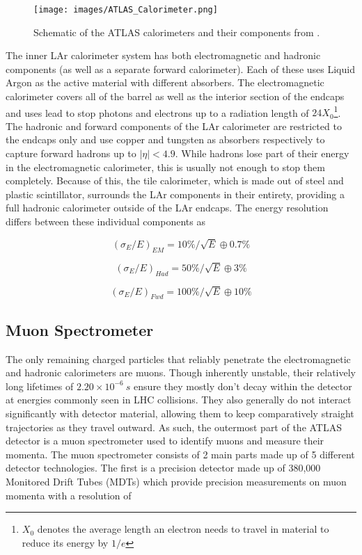 \begin{figure}
\centering
    \texttt{[image: images/ATLAS\_Calorimeter.png]}
    \caption{Schematic of the ATLAS calorimeters and their components from \cite{atlas-run3-setup}.}
    \label{fig:ATLAS_Calorimeter}
\end{figure}

The inner LAr calorimeter system has both electromagnetic and hadronic components (as well as a separate forward 
calorimeter). Each of these uses Liquid Argon as the active material with different absorbers. The electromagnetic 
calorimeter covers all of the barrel as well as the interior section of the endcaps and uses lead to stop photons and 
electrons up to a radiation length of $24X_0$\footnote{$X_0$ denotes the average length an electron needs to travel 
in material to reduce its energy by $1/e$}. The hadronic and forward components of the LAr calorimeter are 
restricted to the endcaps only and use copper and tungsten as absorbers respectively to capture forward hadrons up to 
$|\eta| < 4.9$. While hadrons lose part of their energy in the electromagnetic calorimeter, this is usually not enough 
to stop them completely. Because of this, the tile calorimeter, which is made out of steel and plastic scintillator, 
surrounds the LAr components in their entirety, providing a full hadronic calorimeter outside of the LAr endcaps. The 
energy resolution differs between these individual components as

\begin{equation} %
(\sigma_{E}/E)_{EM} = 10\% / \sqrt{E} \oplus 0.7\%
\end{equation}

\begin{equation} %
(\sigma_{E}/E)_{Had} = 50\% / \sqrt{E} \oplus 3\%
\end{equation}

\begin{equation} %
(\sigma_{E}/E)_{Fwd} = 100\% / \sqrt{E} \oplus 10\%
\end{equation}

\subsection{Muon Spectrometer}

The only remaining charged particles that reliably penetrate the electromagnetic and hadronic calorimeters are muons. 
Though inherently unstable, their relatively long lifetimes of $2.20\times10^{-6}\ s$ ensure they mostly don't decay 
within the detector at energies commonly seen in LHC collisions. They also generally do not interact significantly 
with detector material, allowing them to keep comparatively straight trajectories as they travel outward. As such, 
the outermost part of the ATLAS detector is a muon spectrometer used to identify muons and measure their momenta. 
The muon spectrometer consists of 2 main parts made up of 5 different detector technologies. The first is a precision 
detector made up of 380,000 Monitored Drift Tubes (MDTs) which provide precision measurements on muon momenta with 
a resolution of


